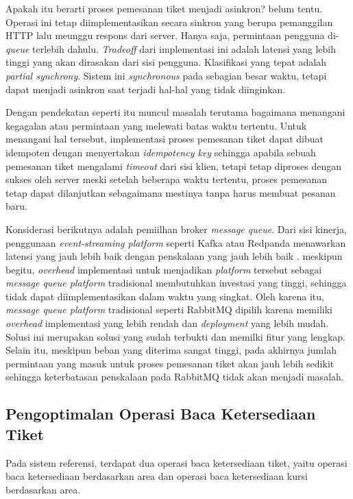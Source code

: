 Apakah itu berarti proses pemesanan tiket menjadi asinkron? belum tentu. Operasi ini tetap diimplementasikan secara sinkron yang berupa pemanggilan HTTP lalu meunggu respons dari server. Hanya saja, permintaan pengguna di-\textit{queue} terlebih dahulu. \textit{Tradeoff} dari implementasi ini adalah latensi yang lebih tinggi yang akan dirasakan dari sisi pengguna. Klasifikasi yang tepat adalah \textit{partial synchrony}. Sistem ini \textit{synchronous} pada sebagian besar waktu, tetapi dapat menjadi asinkron saat terjadi hal-hal yang tidak diinginkan.

Dengan pendekatan seperti itu muncul masalah terutama bagaimana menangani kegagalan atau permintaan yang melewati batas waktu tertentu. Untuk menangani hal tersebut, implementasi proses pemesanan tiket dapat dibuat idempoten dengan menyertakan \textit{idempotency key} sehingga apabila sebuah pemesanan tiket mengalami \textit{timeout} dari sisi klien, tetapi tetap diproses dengan sukses oleh server meski setelah beberapa waktu tertentu, proses pemesanan tetap dapat dilanjutkan sebagaimana mestinya tanpa harus membuat pesanan baru.

Konsiderasi berikutnya adalah pemiilhan broker \textit{message queue}. Dari sisi kinerja, penggunaan \textit{event-streaming platform} seperti Kafka atau Redpanda menawarkan latensi yang jauh lebih baik dengan penskalaan yang jauh lebih baik \parencite{comparingKafkaAlternatives}. meskipun begitu, \textit{overhead} implementasi untuk menjadikan \textit{platform} tersebut sebagai \textit{message queue platform} tradisional membutuhkan investasi yang tinggi, sehingga tidak dapat diimplementasikan dalam waktu yang singkat. Oleh karena itu, \textit{message queue platform} tradisional seperti RabbitMQ dipilih karena memiliki \textit{overhead} implementasi yang lebih rendah dan \textit{deployment} yang lebih mudah. Solusi ini merupakan solusi yang sudah terbukti dan memilki fitur yang lengkap. Selain itu, meskipun beban yang diterima sangat tinggi, pada akhirnya jumlah permintaan yang masuk untuk proses pemesanan tiket akan jauh lebih sedikit sehingga keterbatasan penskalaan pada RabbitMQ tidak akan menjadi masalah.

\subsection{Pengoptimalan Operasi Baca Ketersediaan Tiket}

Pada sistem referensi, terdapat dua operasi baca ketersediaan tiket, yaitu operasi baca ketersediaan berdasarkan area dan operasi baca ketersediaan kursi berdasarkan area.

